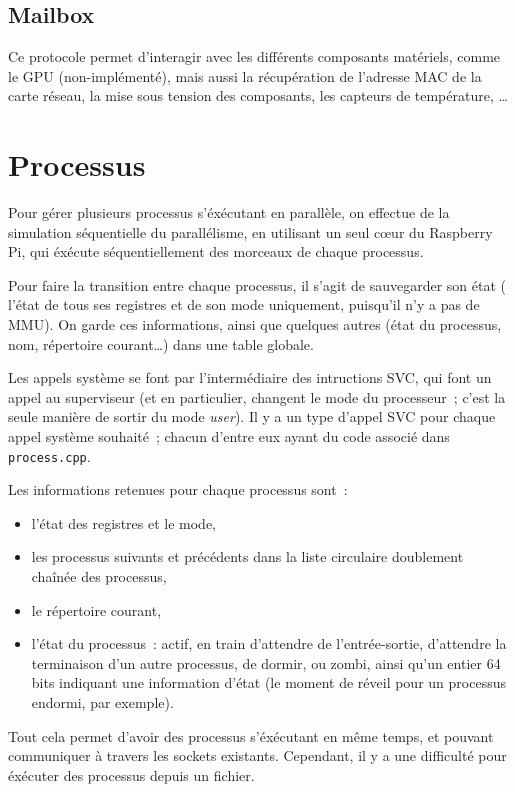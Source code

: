\documentclass[11pt,a4paper]{article}
\newcommand{\fname}[1]{\texttt{#1}} %
\begin{document}
\subsection{Mailbox}
Ce protocole permet d'interagir avec les différents composants matériels,
comme le GPU (non-implémenté), mais aussi la récupération de l'adresse MAC
de la carte réseau, la mise sous tension des composants, les capteurs de
température, \ldots

\section{Processus}

Pour gérer plusieurs processus s'éxécutant en parallèle, on effectue
de la simulation séquentielle du parallélisme, en utilisant un seul
cœur du Raspberry Pi, qui éxécute séquentiellement des morceaux de
chaque processus.

Pour faire la transition entre chaque processus, il s'agit de
sauvegarder son état (\ie{} l'état de tous ses registres et de son mode
uniquement, puisqu'il n'y a pas de MMU). On garde ces informations,
ainsi que quelques autres (état du processus, nom, répertoire
courant\ldots) dans une table globale.

Les appels système se font par l'intermédiaire des intructions SVC,
qui font un appel au superviseur (et en particulier, changent le mode
du processeur~; c'est la seule manière de sortir du mode
\textit{user}). Il y a un type d'appel SVC pour chaque appel système
souhaité~; chacun d'entre eux ayant du code associé dans
\fname{process.cpp}.

Les informations retenues pour chaque processus sont~:
\begin{itemize}
\item{l'état des registres et le mode,}
\item{les processus suivants et précédents dans la liste circulaire
  doublement chaînée des processus,}
\item{le répertoire courant,}
\item{l'état du processus~: actif, en train d'attendre de
  l'entrée-sortie, d'attendre la terminaison d'un autre processus,
  de dormir, ou zombi, ainsi qu'un entier 64 bits indiquant une
  information d'état (le moment de réveil pour un processus endormi,
  par exemple).}
\end{itemize}

Tout cela permet d'avoir des processus s'éxécutant en même temps, et
pouvant communiquer à travers les sockets existants. Cependant, il
y a une difficulté pour éxécuter des processus depuis un fichier.
\\
\end{document}
